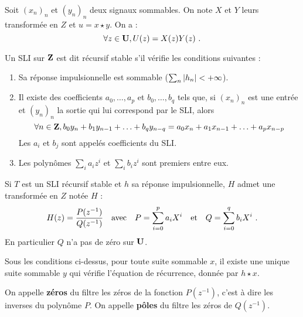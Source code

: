 \begin{pop}
	Soit $(x_{n})_n$ et $(y_{n})_n$ deux signaux sommables. On note $X$ et $Y$ leurs transformée en $Z$ et $u = x \star y$. On a :
	\vspace{-0.15cm}$$
	\forall z \in \U, U(z)=X(z)Y(z)\ .
	\vspace{-0.15cm}$$
\end{pop}

\begin{defn}
	Un SLI sur $\mathbf{Z}$ est dit récursif stable s'il vérifie les conditions suivantes :
	\begin{enumerate}
	\item
		Sa réponse impulsionnelle est sommable ($\sum_n \left\lvert h_n\right\rvert < + \infty$).
	\item
		Il existe des coefficients $a_0,\ldots,a_p$ et $b_0,\ldots,b_q$ tels que, si $(x_n)_n$ est une entrée et $(y_n)_n$ la sortie qui lui correspond par le SLI, alors
		\vspace{-0.15cm}$$
		\forall n \in \Z, b_0 y_n + b_1 y_{n - 1} + \ldots + b_q y_{n - q} = a_0 x_n + a_1 x_{n - 1} + \ldots + a_p x_{n - p}
		\vspace{-0.15cm}$$
		Les $a_i$ et $b_j$ sont appelés coefficients du SLI.
	\item
		Les polynômes $\sum_i a_i z^i$ et $\sum_i b_i z^i$ sont premiers entre eux.
	\end{enumerate}
\end{defn}

\begin{pop}
	Si $T$ est un SLI récursif stable et $h$ sa réponse impulsionnelle, $H$ admet une transformée en $Z$ notée $H$ :
	\vspace{-0.15cm}$$
	H(z) = \frac{P(z^{-1})}{Q(z^{-1})}
	\quad \text{avec}\quad
	P = \sum_{i = 0}^p a_i X^i
	\quad \text{et}\quad
	Q = \sum_{i = 0}^q b_i X^i\ .
	\vspace{-0.15cm}$$
	En particulier $Q$ n'a pas de zéro sur $\mathbf{U}$.
\end{pop}

\begin{pop}
	Sous les conditions ci-dessus, pour toute suite sommable $x$, il existe une unique suite sommable $y$ qui vérifie l'équation de récurrence, donnée par $h \star x$.
\end{pop}

\begin{defn}
	On appelle \textbf{zéros} du filtre les zéros de la fonction $P(z^{-1})$, c'est à dire les inverses du polynôme $P$.
	On appelle \textbf{pôles} du filtre les zéros de $Q(z^{-1})$.
\end{defn}

